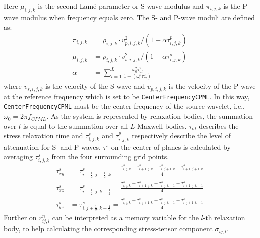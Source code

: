 \documentclass[pdftex,a4paper,parskip,listof=totoc,bibliography=totoc,onehalfspacing,12pt]{scrreprt}
\begin{document}
Here $\mu_{i,j,k}$ is the second Lam\'{e} parameter or S-wave modulus and $\pi_{i,j,k}$ is the P-wave modulus when frequency equals zero.
The S- and P-wave moduli are defined as:
\begin{align}
	\pi_{i,j,k} &= \rho_{i,j,k}\cdot v_{p,i,j,k}^{2} / (1 + \alpha \tau^p_{i,j,k})\\
	\mu_{i,j,k}&= \rho_{i,j,k}\cdot v_{s,i,j,k}^{2} / (1 + \alpha \tau^s_{i,j,k})\\
	\alpha &= \sum_{l=1}^L \frac{\omega_0^2 \tau_{\sigma l}^2}{1+(\omega_0^2 \tau_{\sigma l}^2)}
\end{align}
where $v_{s,i,j,k}$ is the velocity of the S-wave and $v_{p,i,j,k}$ is the velocity of the P-wave at the reference frequency which is set to be \verb+CenterFrequencyCPML+. In this way, \verb+CenterFrequencyCPML+ must be the center frequency of the source wavelet, i.e., $\omega_0=2 \pi f_{CPML}$.
As the system is represented by relaxation bodies, the summation over $l$ is equal to the summation over all $L$ Maxwell-bodies. $\tau_{\sigma l}$ describes the stress relaxation time and $\tau^s_{i,j,k}$ and $\tau^p_{i,j,k}$ respectively describe the level of attenuation for S- and P-waves. $\tau^s$ on the center of planes is calculated by averaging $\tau^s_{i,j,k}$  from the four surrounding grid points. 
\begin{align*}
	\tau^s_{xy} &= \tau^s_{i+\frac{1}{2},j+\frac{1}{2},k} = \frac{\tau^s_{i,j,k} + \tau^s_{i+1,j,k} + \tau^s_{i,j+1,k} + \tau^s_{i+1,j+1,k}}{4}\\
	\tau^s_{xz} &= \tau^s_{i+\frac{1}{2},j,k+\frac{1}{2}} = \frac{\tau^s_{i,j,k} + \tau^s_{i+1,j,k} + \tau^s_{i,j,k+1} + \tau^s_{i+1,j,k+1}}{4}\\
	\tau^s_{yz} &= \tau^s_{i,j+\frac{1}{2},k+\frac{1}{2}} = \frac{\tau^s_{i,j,k} + \tau^s_{i,j+1,k} + \tau^s_{i,j,k+1} + \tau^s_{i,j+1,k+1}}{4}
\end{align*}
Further on $r_{ij,l}^{n}$ can be interpreted as a memory variable for the $l$-th relaxation body, to help calculating the corresponding stress-tensor component $\sigma_{ij,l}$.
\end{document}

